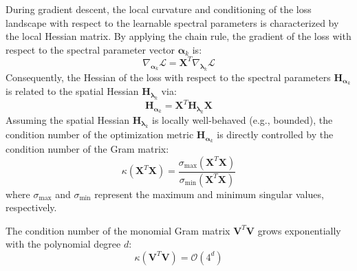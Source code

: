 During gradient descent, the local curvature and conditioning of the loss landscape with respect to the learnable spectral parameters is characterized by the local Hessian matrix. By applying the chain rule, the gradient of the loss with respect to the spectral parameter vector $\boldsymbol{\alpha}_k$ is:
\begin{equation}
\nabla_{\boldsymbol{\alpha}_k} \mathcal{L} = \mathbf{X}^T \nabla_{\boldsymbol{\lambda}_k} \mathcal{L}
\end{equation}
Consequently, the Hessian of the loss with respect to the spectral parameters $\mathbf{H}_{\boldsymbol{\alpha}_k}$ is related to the spatial Hessian $\mathbf{H}_{\boldsymbol{\lambda}_k}$ via:
\begin{equation}
\mathbf{H}_{\boldsymbol{\alpha}_k} = \mathbf{X}^T \mathbf{H}_{\boldsymbol{\lambda}_k} \mathbf{X}
\end{equation}
Assuming the spatial Hessian $\mathbf{H}_{\boldsymbol{\lambda}_k}$ is locally well-behaved (e.g., bounded), the condition number of the optimization metric $\mathbf{H}_{\boldsymbol{\alpha}_k}$ is directly controlled by the condition number of the Gram matrix:
\begin{equation}
\kappa(\mathbf{X}^T \mathbf{X}) = \frac{\sigma_{\max}(\mathbf{X}^T \mathbf{X})}{\sigma_{\min}(\mathbf{X}^T \mathbf{X})}
\end{equation}
where $\sigma_{\max}$ and $\sigma_{\min}$ represent the maximum and minimum singular values, respectively.

\begin{theorem}
The condition number of the monomial Gram matrix $\mathbf{V}^T \mathbf{V}$ grows exponentially with the polynomial degree $d$:
\begin{equation}
\kappa(\mathbf{V}^T \mathbf{V}) = \mathcal{O}(4^d)
\end{equation}
\end{theorem}

